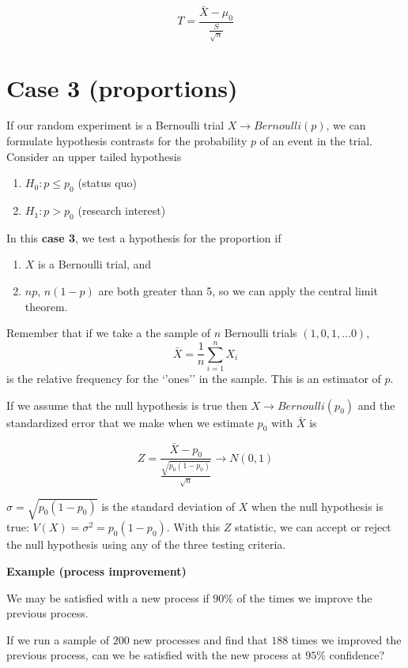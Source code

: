 \documentclass[
]{book}
\providecommand{\tightlist}{%
  \setlength{\itemsep}{0pt}\setlength{\parskip}{0pt}}
\begin{document}
\[T=\frac{\bar{X}-\mu_0}{\frac{S}{\sqrt{n}}}\]

\hypertarget{case-3-proportions-1}{%
\section{Case 3 (proportions)}\label{case-3-proportions-1}}

If our random experiment is a Bernoulli trial \(X \rightarrow Bernoulli(p)\), we can formulate hypothesis contrasts for the probability \(p\) of an event in the trial. Consider an upper tailed hypothesis

\begin{enumerate}
\def\labelenumi{\alph{enumi}.}
\tightlist
\item
  \(H_0: p \leq p_0\) (status quo)
\item
  \(H_1: p> p_0\) (research interest)
\end{enumerate}

In this \textbf{case 3}, we test a hypothesis for the proportion if

\begin{enumerate}
\def\labelenumi{\arabic{enumi}.}
\tightlist
\item
  \(X\) is a Bernoulli trial, and
\item
  \(np\), \(n(1-p)\) are both greater than 5, so we can apply the central limit theorem.
\end{enumerate}

Remember that if we take a the sample of \(n\) Bernoulli trials \((1,0,1,...0)\), \[\bar{X}=\frac{1}{n}\sum_{i=1}^n X_i\] is the relative frequency for the `'ones'' in the sample. This is an estimator of \(p\).

If we assume that the null hypothesis is true then \(X \rightarrow Bernoulli(p_0)\) and the standardized error that we make when we estimate \(p_0\) with \(\bar{X}\) is

\[Z=\frac{\bar{X}-p_0}{\frac{\sqrt{p_0(1-p_0)}}{\sqrt{n}}}  \rightarrow N(0,1)\]

\(\sigma=\sqrt{p_0(1-p_0)}\) is the standard deviation of \(X\) when the null hypothesis is true: \(V(X)=\sigma^2=p_0(1-p_0)\). With this \(Z\) statistic, we can accept or reject the null hypothesis using any of the three testing criteria.

\textbf{Example (process improvement)}

We may be satisfied with a new process if \(90\%\) of the times we improve the previous process.

If we run a sample of \(200\) new processes and find that \(188\) times we improved the previous process, can we be satisfied with the new process at \(95\%\) confidence?
\end{document}
